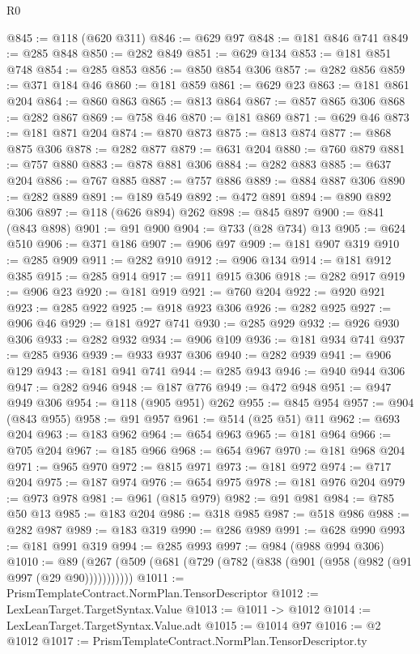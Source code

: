 \begin{lexlean}{R0}
\begin{coremodule}
@845 := @118 (@620 @311)
@846 := @629 @97
@848 := @181 @846 @741
@849 := @285 @848
@850 := @282 @849
@851 := @629 @134
@853 := @181 @851 @748
@854 := @285 @853
@856 := @850 @854 @306
@857 := @282 @856
@859 := @371 @184 @46
@860 := @181 @859
@861 := @629 @23
@863 := @181 @861 @204
@864 := @860 @863
@865 := @813 @864
@867 := @857 @865 @306
@868 := @282 @867
@869 := @758 @46
@870 := @181 @869
@871 := @629 @46
@873 := @181 @871 @204
@874 := @870 @873
@875 := @813 @874
@877 := @868 @875 @306
@878 := @282 @877
@879 := @631 @204
@880 := @760 @879
@881 := @757 @880
@883 := @878 @881 @306
@884 := @282 @883
@885 := @637 @204
@886 := @767 @885
@887 := @757 @886
@889 := @884 @887 @306
@890 := @282 @889
@891 := @189 @549
@892 := @472 @891
@894 := @890 @892 @306
@897 := @118 (@626 @894) @262
@898 := @845 @897
@900 := @841 (@843 @898)
@901 := @91 @900
@904 := @733 (@28 @734) @13
@905 := @624 @510
@906 := @371 @186
@907 := @906 @97
@909 := @181 @907 @319
@910 := @285 @909
@911 := @282 @910
@912 := @906 @134
@914 := @181 @912 @385
@915 := @285 @914
@917 := @911 @915 @306
@918 := @282 @917
@919 := @906 @23
@920 := @181 @919
@921 := @760 @204
@922 := @920 @921
@923 := @285 @922
@925 := @918 @923 @306
@926 := @282 @925
@927 := @906 @46
@929 := @181 @927 @741
@930 := @285 @929
@932 := @926 @930 @306
@933 := @282 @932
@934 := @906 @109
@936 := @181 @934 @741
@937 := @285 @936
@939 := @933 @937 @306
@940 := @282 @939
@941 := @906 @129
@943 := @181 @941 @741
@944 := @285 @943
@946 := @940 @944 @306
@947 := @282 @946
@948 := @187 @776
@949 := @472 @948
@951 := @947 @949 @306
@954 := @118 (@905 @951) @262
@955 := @845 @954
@957 := @904 (@843 @955)
@958 := @91 @957
@961 := @514 (@25 @51) @11
@962 := @693 @204
@963 := @183 @962
@964 := @654 @963
@965 := @181 @964
@966 := @705 @204
@967 := @185 @966
@968 := @654 @967
@970 := @181 @968 @204
@971 := @965 @970
@972 := @815 @971
@973 := @181 @972
@974 := @717 @204
@975 := @187 @974
@976 := @654 @975
@978 := @181 @976 @204
@979 := @973 @978
@981 := @961 (@815 @979)
@982 := @91 @981
@984 := @785 @50 @13
@985 := @183 @204
@986 := @318 @985
@987 := @518 @986
@988 := @282 @987
@989 := @183 @319
@990 := @286 @989
@991 := @628 @990
@993 := @181 @991 @319
@994 := @285 @993
@997 := @984 (@988 @994 @306)
@1010 := @89 (@267 (@509 (@681 (@729 (@782 (@838 (@901 (@958 (@982 (@91 @997 (@29 @90)))))))))))
@1011 := PrismTemplateContract.NormPlan.TensorDescriptor
@1012 := LexLeanTarget.TargetSyntax.Value
@1013 := @1011 -> @1012
@1014 := LexLeanTarget.TargetSyntax.Value.adt
@1015 := @1014 @97
@1016 := @2 @1012
@1017 := PrismTemplateContract.NormPlan.TensorDescriptor.ty

\end{coremodule}
\end{lexlean}
